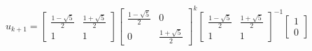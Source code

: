 \documentclass[preview]{standalone}
\begin{document}
\begin{center}
$$u_{k + 1} = \begin{bmatrix} \frac{1 - \sqrt{5}}{2} & \frac{1 + \sqrt{5}}{2} \\ 1 & 1 \end{bmatrix} \begin{bmatrix} \frac{1 - \sqrt{5}}{2} &  0 \\ 0 & \frac{1 + \sqrt{5}}{2} \end{bmatrix}^k \begin{bmatrix} \frac{1 - \sqrt{5}}{2} &  \frac{1 + \sqrt{5}}{2} \\ 1 & 1 \end{bmatrix}^{-1} \begin{bmatrix} 1 \\ 0 \end{bmatrix}$$
\end{center}
\end{document}
